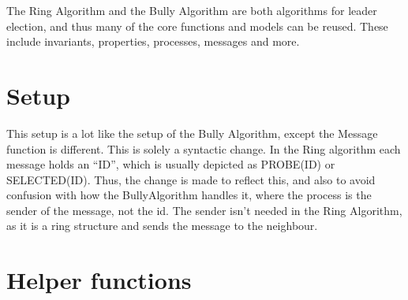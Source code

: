 \documentclass{report}
\begin{document}
\begin{calloutgreen}
\begin{calloutyellow}
The Ring Algorithm and the Bully Algorithm are both algorithms for leader election, and thus many of the core functions and models can be reused. These include invariants, properties, processes, messages and more.

\section{Setup}
\noindent{}

This setup is a lot like the setup of the Bully Algorithm, except the Message function is different. This is solely a syntactic change. In the Ring algorithm each message holds an ``ID'', which is usually depicted as PROBE(ID) or SELECTED(ID). Thus, the change is made to reflect this, and also to avoid confusion with how the BullyAlgorithm handles it, where the process is the sender of the message, not the id. The sender isn't needed in the Ring Algorithm, as it is a ring structure and sends the message to the neighbour.

\section{Helper functions}
\noindent{}



\end{calloutyellow}
\end{calloutgreen}
\end{document}
